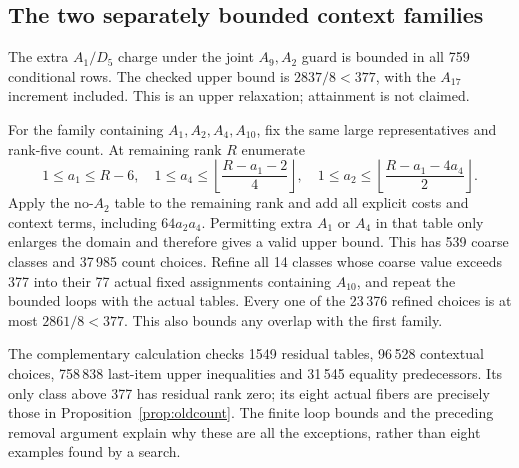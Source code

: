 \documentclass[11pt]{article}
\theoremstyle{remark}\newtheorem{remark}[theorem]{Remark}
\begin{document}
\subsection{The two separately bounded context families}

The extra $A_1/D_5$ charge under the joint $A_9,A_2$ guard is
bounded in all 759 conditional rows. The checked upper bound is
$2837/8<377$, with the $A_{17}$ increment included. This is an
upper relaxation; attainment is not claimed.

For the family containing $A_1,A_2,A_4,A_{10}$, fix the same
large representatives and rank-five count. At remaining rank $R$
enumerate
\[
 1\le a_1\le R-6,\quad
 1\le a_4\le\left\lfloor\frac{R-a_1-2}{4}\right\rfloor,
 \quad
 1\le a_2\le\left\lfloor\frac{R-a_1-4a_4}{2}\right\rfloor.
\]
Apply the no-$A_2$ table to the remaining rank and add all explicit
costs and context terms, including $64a_2a_4$. Permitting extra
$A_1$ or $A_4$ in that table only enlarges the domain and therefore
gives a valid upper bound. This has 539 coarse classes and
37\,985 count choices. Refine all 14 classes whose coarse value
exceeds 377 into their 77 actual fixed assignments containing
$A_{10}$, and repeat the bounded loops with the actual tables.
Every one of the 23\,376 refined choices is at most $2861/8<377$.
This also bounds any overlap with the first family.

The complementary calculation checks 1549 residual tables,
96\,528 contextual choices, 758\,838 last-item upper inequalities
and 31\,545 equality predecessors. Its only class above 377 has
residual rank zero; its eight actual fibers are precisely those
in Proposition~\ref{prop:oldcount}. The finite loop bounds and
the preceding removal argument explain why these are all the
exceptions, rather than eight examples found by a search.
\end{document}
